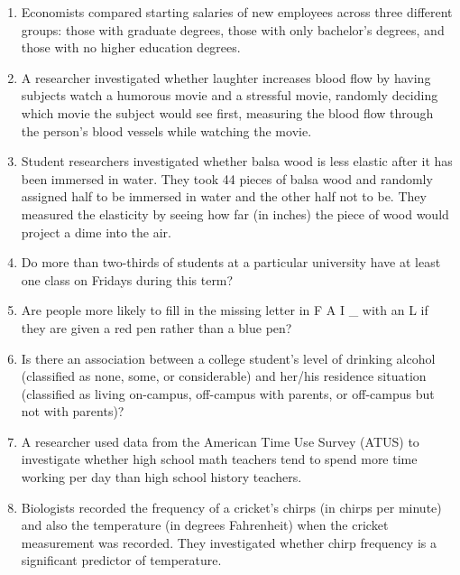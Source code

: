\begin{enumerate} [leftmargin=1cm, itemsep=.2em]


\item Economists compared starting salaries of new employees across three different groups: those with graduate degrees, those with only bachelor's degrees, and those with no higher education degrees.





\item A researcher investigated whether laughter increases blood flow by having subjects watch a humorous movie and a stressful movie, randomly deciding which movie the subject would see first, measuring the blood flow through the person's blood vessels while watching the movie.





\item Student researchers investigated whether balsa wood is less elastic after it has been immersed in water. They took 44 pieces of balsa wood and randomly assigned half to be immersed in water and the other half not to be. They measured the elasticity by seeing how far (in inches) the piece of wood would project a dime into the air.





\item Do more than two-thirds of students at a particular university have at least one class on Fridays during this term?





\item Are people more likely to fill in the missing letter in F A I \_ with an L if they are given a red pen rather than a blue pen?





\item Is there an association between a college student's level of drinking alcohol (classified as none, some, or considerable) and her/his residence situation (classified as living on-campus, off-campus with parents, or off-campus but not with parents)?





\item A researcher used data from the American Time Use Survey (ATUS) to investigate whether high school math teachers tend to spend more time working per day than high school history teachers.





\item Biologists recorded the frequency of a cricket's chirps (in chirps per minute) and also the temperature (in degrees Fahrenheit) when the cricket measurement was recorded. They investigated whether chirp frequency is a significant predictor of temperature.


\end{enumerate}








